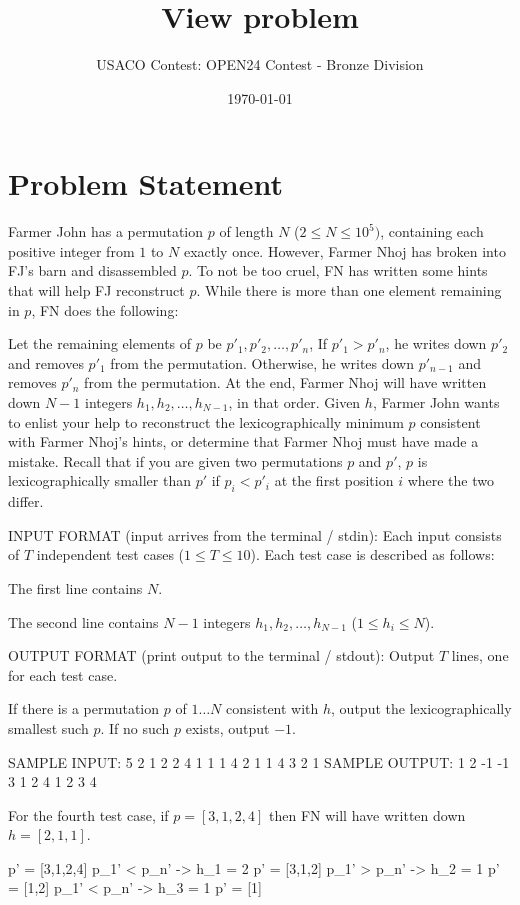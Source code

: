 \documentclass[12pt]{article}
\title{View problem}
\author{USACO Contest: OPEN24 Contest - Bronze Division}
\date{\today}
\begin{document}
\maketitle

\section*{Problem Statement}


Farmer John has a permutation $p$ of length $N$ ($2 \leq N \leq 10^5)$,
containing each positive integer from $1$ to $N$ exactly once. However, Farmer
Nhoj has broken into FJ's barn and disassembled $p$. To not be too cruel, FN has
written some hints that will help FJ reconstruct $p$. While there is more than
one element remaining in $p$, FN does the following:

Let the remaining elements of $p$ be
$p'_1, p'_2, \dots , p'_n$,
 If $p'_1 > p'_n$, he writes down $p'_2$ and removes $p'_1$ from the
permutation. Otherwise, he writes down $p'_{n-1}$ and removes $p'_n$ from the
permutation.
At the end, Farmer Nhoj will have written down $N - 1$ integers
$h_1, h_2, \dots, h_{N-1}$, in that order. Given $h$, Farmer John wants to
enlist your help to reconstruct the lexicographically minimum $p$ consistent
with Farmer Nhoj's hints, or determine that Farmer Nhoj must have made a
mistake.  Recall that if you are given two permutations $p$ and $p'$,
$p$ is lexicographically smaller than $p'$ if $p_i < p'_i$ at the first
position $i$ where the two differ.

INPUT FORMAT (input arrives from the terminal / stdin):
Each input consists of $T$ independent test cases ($1\le T\le 10$). Each test
case is described as follows:

The first line contains $N$.

The second line contains $N - 1$ integers $h_1, h_2, \dots, h_{N-1}$
($1\le h_i\le N$).

OUTPUT FORMAT (print output to the terminal / stdout):
Output $T$ lines, one for each test case.

If there is a permutation $p$ of $1\dots N$ consistent with $h$, output the
lexicographically smallest such $p$. If no such $p$ exists, output $-1$.

SAMPLE INPUT:
5
2
1
2
2
4
1 1 1
4
2 1 1
4
3 2 1
SAMPLE OUTPUT: 
1 2
-1
-1
3 1 2 4
1 2 3 4

For the fourth test case, if $p=[3,1,2,4]$ then FN will have written down
$h=[2,1,1]$.


p' = [3,1,2,4]
p_1' < p_n' -> h_1 = 2
p' = [3,1,2]
p_1' > p_n' -> h_2 = 1
p' = [1,2]
p_1' < p_n' -> h_3 = 1
p' = [1]
\end{document}
